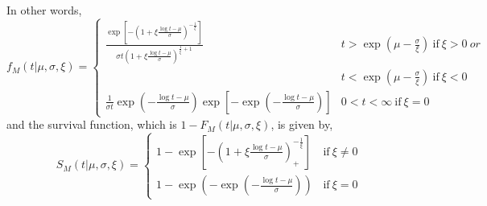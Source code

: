 \documentclass[smallextended]{svjour3}       %
\begin{document}
In other words,
\[
f_M(t|\mu,\sigma,\xi)=\begin{cases}
\frac{\exp[-(1+\xi\frac{\log t-\mu}{\sigma})^{-\frac{1}{\xi}}]}{\sigma t(1+\xi\frac{\log t-\mu}{\sigma})^{\frac{1}{\xi}+1}} & t>\exp(\mu-\frac{\sigma}{\xi})\ \mbox{if}\ \xi>0 \:or\\
\                                                                                                                           & t<\exp(\mu-\frac{\sigma}{\xi})\ \mbox{if}\ \xi<0\\
\frac{1}{\sigma t}\exp(-\frac{\log t-\mu}{\sigma})\exp[-\exp(-\frac{\log t-\mu}{\sigma})]  & 0<t<\infty\ \mbox{if}\ \xi=0
\end{cases}
\]
and the survival function, which is $1-F_M(t|\mu,\sigma,\xi)$, is given by,
\[
S_M(t|\mu,\sigma,\xi)=\begin{cases}
1-\exp[-(1+\xi\frac{\log t-\mu}{\sigma})_{+}^{-\frac{1}{\xi}}]\  & \mbox{if}\ \xi\neq0\\
1-\exp(-\exp(-\frac{\log t-\mu}{\sigma})) & \mbox{if}\ \xi=0
\end{cases}
\]
\end{document}
